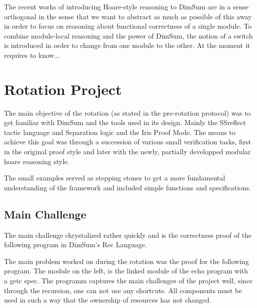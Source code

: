 \documentclass[runningheads, orivec]{llncs}
\begin{document}
The recent works of introducing Hoare-style reasoning to DimSum are in a sense orthogonal in the sense that we want to abstract as much as possible of this away in order to focus on reasoning about functional correctness of a single module. To combine module-local reasoning and the power of DimSum, the notion of a switch is introduced in order to change from one module to the other. At the moment it requires to know...

\section{Rotation Project}

The main objective of the rotation (as stated in the pre-rotation protocol) was to get familiar with DimSum and the tools used in its design. Mainly the SSreflect tactic language and Separation logic and the Iris Proof Mode. The means to achieve this goal was through a succession of various small verification tasks, first in the original proof style and later with the newly, partially developped modular hoare reasoning style.

The small examples served as stepping stones to get a more fundamental understanding of the framework and included simple functions and specifications.

\subsection{Main Challenge}

The main challenge chrystalized rather quickly and is the correctness proof of the following program in DimSum's Rec Language.

The main problem worked on during the rotation was the proof for the following program. The module on the left, is the linked module of the echo program with a getc spec.
The programm captures the main challenges of the project well, since through the recursion, one can not use any shortcuts. All components must be used in such a way that the ownership of resources has not changed.
\end{document}
